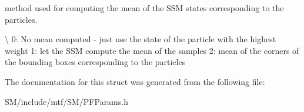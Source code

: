 method used for computing the mean of the S\-S\-M states corresponding to the particles. 

\textbackslash{} 0\-: No mean computed -\/ just use the state of the particle with the highest weight 1\-: let the S\-S\-M compute the mean of the samples 2\-: mean of the corners of the bounding boxes corresponding to the particles 

The documentation for this struct was generated from the following file\-:\begin{DoxyCompactItemize}
\item 
S\-M/include/mtf/\-S\-M/P\-F\-Params.\-h\end{DoxyCompactItemize}
